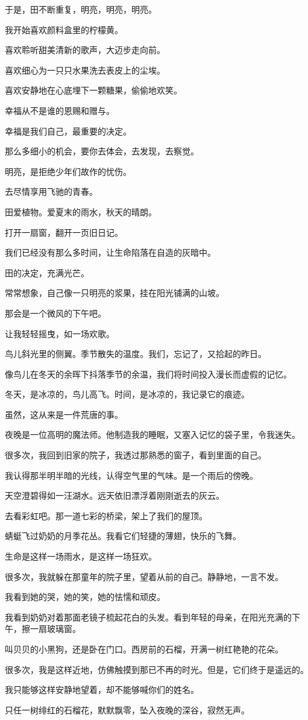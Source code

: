 		于是，田不断重复，明亮，明亮，明亮。

		我开始喜欢颜料盒里的柠檬黄。\par
		喜欢聆听甜美清新的歌声，大迈步走向前。\par
		喜欢细心为一只只水果洗去表皮上的尘埃。\par
		喜欢安静地在心底埋下一颗糖果，偷偷地欢笑。\par
		幸福从不是谁的恩赐和赠与。\par
		幸福是我们自己，最重要的决定。\par
		那么多细小的机会，要你去体会，去发现，去察觉。\par
		明亮，是拒绝少年们故作的忧伤。\par
		去尽情享用飞驰的青春。

		田爱植物。爱夏末的雨水，秋天的晴朗。\par
		打开一扇窗，翻开一页旧日记。\par
		我们已经没有那么多时间，让生命陷落在自造的灰暗中。\par
		田的决定，充满光芒。

		常常想象，自己像一只明亮的浆果，挂在阳光铺满的山坡。\par
		那会是一个微风的下午吧。\par
		让我轻轻摇曳，如一场欢歌。

	\endwriting



		鸟儿斜光里的侧翼。季节散失的温度。我们，忘记了，又拾起的昨日。


		像鸟儿在冬天的余晖下抖落季节的余温，我们将时间投入漫长而虚假的记忆。\par
		冬天，是冰凉的，鸟儿高飞。时间，是冰凉的，我记录它的痕迹。\par
		虽然，这从来是一件荒唐的事。

		夜晚是一位高明的魔法师。他制造我的睡眠，又塞入记忆的袋子里，令我迷失。\par
		很多次，我回到旧家的院子，我透过那熟悉的窗子，看到里面的自己。\par
		我认得那半明半暗的光线，认得空气里的气味。是一个雨后的傍晚。\par
		天空澄碧得如一汪湖水。远天依旧漂浮着刚刚逝去的灰云。\par
		去看彩虹吧。那一道七彩的桥梁，架上了我们的屋顶。\par
		蜻蜓飞过奶奶的月季花丛。我看它们轻捷的薄翅，快乐的飞舞。\par
		生命是这样一场雨水，是这样一场狂欢。\par
		很多次，我就躲在那童年的院子里，望着从前的自己。静静地，一言不发。\par
		我看到她的哭，她的笑，她的怯懦和顽皮。\par
		我看到奶奶对着那面老镜子梳起花白的头发。看到年轻的母亲，在阳光充满的下午，擦一扇玻璃窗。\par
		叫贝贝的小黑狗，还是卧在门口。西房前的石榴，开满一树红艳艳的花朵。\par
		很多次，我是这样近地，仿佛触摸到那已不再的时光。但是，它们终于是遥远的。\par
		我只能够这样安静地望着，却不能够喊你们的姓名。\par
		只任一树绯红的石榴花，默默飘零，坠入夜晚的深谷，寂然无声。

